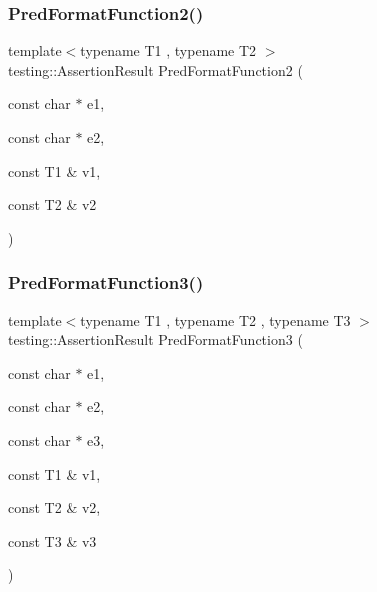 \subsubsection{\texorpdfstring{PredFormatFunction2()}{PredFormatFunction2()}}
{\footnotesize\ttfamily template$<$typename T1 , typename T2 $>$ \\
testing\+::\+Assertion\+Result Pred\+Format\+Function2 (\begin{DoxyParamCaption}\item[{const char $\ast$}]{e1,  }\item[{const char $\ast$}]{e2,  }\item[{const T1 \&}]{v1,  }\item[{const T2 \&}]{v2 }\end{DoxyParamCaption})}

\mbox{\label{_obj__test_2lib_2googletest-master_2googletest_2test_2gtest__pred__impl__unittest_8cc_abddc62e1faf4d19992a0acb69577e0f3}} 
\subsubsection{\texorpdfstring{PredFormatFunction3()}{PredFormatFunction3()}}
{\footnotesize\ttfamily template$<$typename T1 , typename T2 , typename T3 $>$ \\
testing\+::\+Assertion\+Result Pred\+Format\+Function3 (\begin{DoxyParamCaption}\item[{const char $\ast$}]{e1,  }\item[{const char $\ast$}]{e2,  }\item[{const char $\ast$}]{e3,  }\item[{const T1 \&}]{v1,  }\item[{const T2 \&}]{v2,  }\item[{const T3 \&}]{v3 }\end{DoxyParamCaption})}

\mbox{\label{_obj__test_2lib_2googletest-master_2googletest_2test_2gtest__pred__impl__unittest_8cc_a9fbd4c3333dcc98c0cfee19ce28bc2b1}} 
